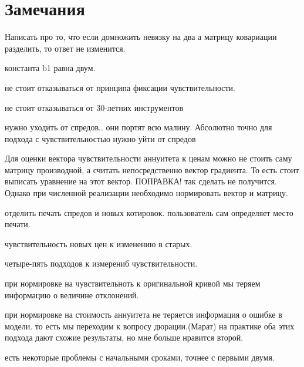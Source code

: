 \documentclass[10pt]{article}
\theoremstyle{definition}
\theoremstyle{remark}
\theoremstyle{plain}
\begin{document}
\section{Замечания}
Написать про то, что если домножить невязку на два а матрицу ковариации разделить, то ответ не изменится.

константа b1 равна двум.

не стоит отказываться от принципа фиксации чувствительности.

не стоит отказываться от 30-летних инструментов

нужно уходить от спредов.. они портят всю малину. Абсолютно точно для подхода с чувствительностью нужно уйти от спредов

Для оценки вектора чувствительности аннуитета к ценам можно не стоить саму матрицу производной, а считать непосредственно вектор градиента. То есть стоит выписать уравнение на этот вектор. ПОПРАВКА! так сделать не получится. Однако при численной реализации необходимо нормировать вектор и матрицу.


отделить печать спредов и новых котировок. пользователь сам определяет место печати.

чувствительность новых цен к изменению в старых.

четыре-пять подходов к измерениб чувствительности.

при нормировке на чувствительноть к оригинальной кривой мы теряем информацию о величине отклонений.

при нормировке на стоимость аннуитета не теряется информация о ошибке в модели. то есть мы переходим к вопросу дюрации.(Марат) на практике оба этих подхода дают схожие результаты, но мне больше нравится второй.

есть некоторые проблемы с начальными сроками, точнее с первыми двумя.


\newpage
{}

\end{document}
